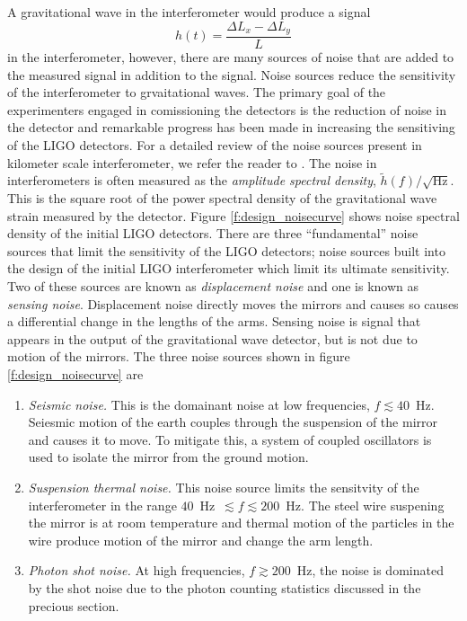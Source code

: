 A gravitational wave in the interferometer would produce a signal 
\begin{equation}
h(t) = \frac{\Delta L_x - \Delta L_y}{L}
\end{equation}
in the interferometer, however, there are many sources of noise that are added
to the measured signal in addition to the signal.  Noise sources reduce the
sensitivity of the interferometer to grvaitational waves. The primary goal of
the experimenters engaged in comissioning the detectors is the reduction of
noise in the detector and remarkable progress has been made in increasing the
sensitiving of the LIGO detectors.  For a detailed review of the noise sources
present in kilometer scale interferometer, we refer the reader to
\cite{rana:thesis}. The noise in interferometers is often measured as the
\emph{amplitude spectral density}, $\tilde{h}(f) / \sqrt{\mathrm{Hz}}$. This
is the square root of the power spectral density of the gravitational wave
strain measured by the detector.  Figure \ref{f:design_noisecurve} shows noise
spectral density of the initial LIGO detectors. There are three
``fundamental'' noise sources that limit the sensitivity of the LIGO
detectors; noise sources built into the design of the initial LIGO
interferometer which limit its ultimate sensitivity.  Two of these sources are
known as \emph{displacement noise} and one is known as \emph{sensing noise}.
Displacement noise directly moves the mirrors and causes so causes a
differential change in the lengths of the arms.  Sensing noise is signal that
appears in the output of the gravitational wave detector, but is not due to
motion of the mirrors.  The three noise sources shown in figure
\ref{f:design_noisecurve} are
\begin{enumerate}
\item \emph{Seismic noise.} This is the domainant noise at low frequencies, $f
\lesssim 40$~Hz.  Seiesmic motion of the earth couples through the suspension
of the mirror and causes it to move. To mitigate this, a system of coupled
oscillators is used to isolate the mirror from the ground motion. 

\item \emph{Suspension thermal noise.} This noise source limits the
sensitvity of the interferometer in the range $40$~Hz~$\lesssim f \lesssim
200$~Hz. The steel wire suspening the mirror is at room temperature and
thermal motion of the particles in the wire produce motion of the mirror and
change the arm length.

\item \emph{Photon shot noise.} At high frequencies, $f \gtrsim 200$~Hz, the
noise is dominated by the shot noise due to the photon counting statistics
discussed in the precious section.
\end{enumerate}

